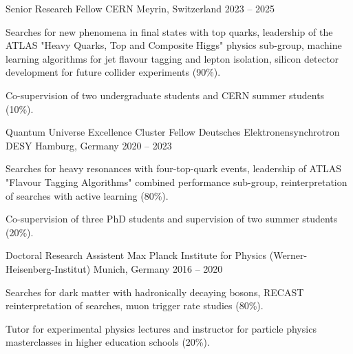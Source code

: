 \begin{cventries}

    \cventry
      {Senior Research Fellow} %
      {CERN} %
      {Meyrin, Switzerland} %
      {2023 -- 2025} %
      {
        \begin{cvitems} %
          \item {Searches for new phenomena in final states with top quarks, leadership of the ATLAS "Heavy Quarks, Top and Composite Higgs" physics sub-group, machine learning algorithms for jet flavour tagging and lepton isolation, silicon detector development for future collider experiments (90\%).}
          \item {Co-supervision of two undergraduate students and CERN summer students (10\%).}
        \end{cvitems}
      }
  
    \cventry
      {Quantum Universe Excellence Cluster Fellow} %
      {Deutsches Elektronensynchrotron DESY} %
      {Hamburg, Germany} %
      {2020 -- 2023} %
      {
        \begin{cvitems} %
          \item {Searches for heavy resonances with four-top-quark events, leadership of ATLAS "Flavour Tagging Algorithms" combined performance sub-group, reinterpretation of searches with active learning (80\%). }
          \item {Co-supervision of three PhD students and supervision of two summer students (20\%).}
        \end{cvitems}
      }
  
    \cventry
      {Doctoral Research Assistent} %
      {Max Planck Institute for Physics (Werner-Heisenberg-Institut)} %
      {Munich, Germany} %
      {2016 -- 2020} %
      {
        \begin{cvitems} %
          \item {Searches for dark matter with hadronically decaying bosons, RECAST reinterpretation of searches, muon trigger rate studies (80\%).}
          \item {Tutor for experimental physics lectures and instructor for particle physics masterclasses in higher education schools (20\%).}
        \end{cvitems}
      }
  
  \end{cventries}
  